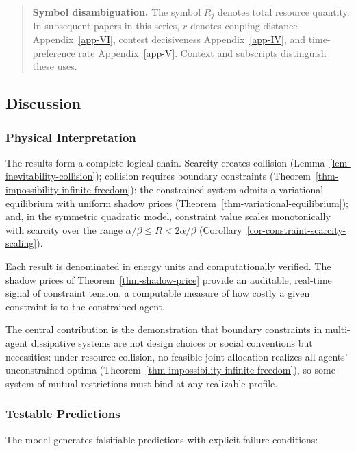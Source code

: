 \documentclass[11pt]{article}
\theoremstyle{plain}
\theoremstyle{definition}
\theoremstyle{remark}
\let\origsubsection\subsection
\renewcommand{\subsection}{\needspace{7\baselineskip}\origsubsection}
\let\origsubsubsection\subsubsection
\renewcommand{\subsubsection}{\needspace{4\baselineskip}\origsubsubsection}
\begin{document}
\begin{quote}
\textbf{Symbol disambiguation.} The symbol \(R_j\) denotes total
resource quantity. In subsequent papers in this series, \(r\) denotes
coupling distance Appendix~\ref{app-VI}, contest decisiveness
Appendix~\ref{app-IV}, and time-preference rate Appendix~\ref{app-V}.
Context and subscripts distinguish these uses.
\end{quote}

\subsection{Discussion}\label{discussion}

\subsubsection{Physical Interpretation}\label{physical-interpretation-1}

The results form a complete logical chain. Scarcity creates collision
(Lemma~\ref{lem-inevitability-collision}); collision requires boundary
constraints (Theorem~\ref{thm-impossibility-infinite-freedom}); the
constrained system admits a variational equilibrium with uniform shadow
prices (Theorem~\ref{thm-variational-equilibrium}); and, in the
symmetric quadratic model, constraint value scales monotonically with
scarcity over the range \(\alpha/\beta \leq R < 2\alpha/\beta\)
(Corollary~\ref{cor-constraint-scarcity-scaling}).

Each result is denominated in energy units and computationally verified.
The shadow prices of Theorem~\ref{thm-shadow-price} provide an
auditable, real-time signal of constraint tension, a computable measure
of how costly a given constraint is to the constrained agent.

The central contribution is the demonstration that boundary constraints
in multi-agent dissipative systems are not design choices or social
conventions but necessities: under resource collision, no feasible joint
allocation realizes all agents' unconstrained optima
(Theorem~\ref{thm-impossibility-infinite-freedom}), so some system of
mutual restrictions must bind at any realizable profile.

\subsubsection{Testable Predictions}\label{testable-predictions}

The model generates falsifiable predictions with explicit failure
conditions:
\end{document}
